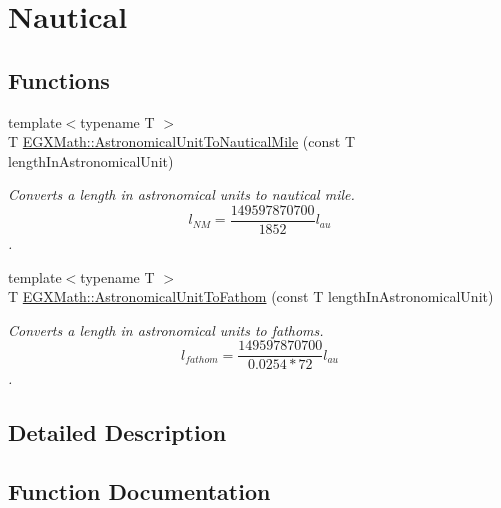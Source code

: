 \hypertarget{group___e_g_x_math-_conversions-_length_conversions-_astronomical-_astronomical_unit-_nautical}{}\section{Nautical}
\label{group___e_g_x_math-_conversions-_length_conversions-_astronomical-_astronomical_unit-_nautical}
\subsection*{Functions}
\begin{DoxyCompactItemize}
\item 
{\footnotesize template$<$typename T $>$ }\\T \mbox{\hyperlink{group___e_g_x_math-_conversions-_length_conversions-_astronomical-_astronomical_unit-_nautical_ga1d18851a119546f6a8e95e3051559f2e}{E\+G\+X\+Math\+::\+Astronomical\+Unit\+To\+Nautical\+Mile}} (const T length\+In\+Astronomical\+Unit)
\begin{DoxyCompactList}\small\item\em Converts a length in astronomical units to nautical mile. \[ l_{NM}= \frac{149597870700}{1852} l_{au} \]. \end{DoxyCompactList}\item 
{\footnotesize template$<$typename T $>$ }\\T \mbox{\hyperlink{group___e_g_x_math-_conversions-_length_conversions-_astronomical-_astronomical_unit-_nautical_ga160015df7b4feb28baa02d92a7f43d5c}{E\+G\+X\+Math\+::\+Astronomical\+Unit\+To\+Fathom}} (const T length\+In\+Astronomical\+Unit)
\begin{DoxyCompactList}\small\item\em Converts a length in astronomical units to fathoms. \[ l_{fathom}= \frac{149597870700}{0.0254 * 72} l_{au} \]. \end{DoxyCompactList}\end{DoxyCompactItemize}


\subsection{Detailed Description}


\subsection{Function Documentation}
\mbox{\label{group___e_g_x_math-_conversions-_length_conversions-_astronomical-_astronomical_unit-_nautical_ga160015df7b4feb28baa02d92a7f43d5c}} 
